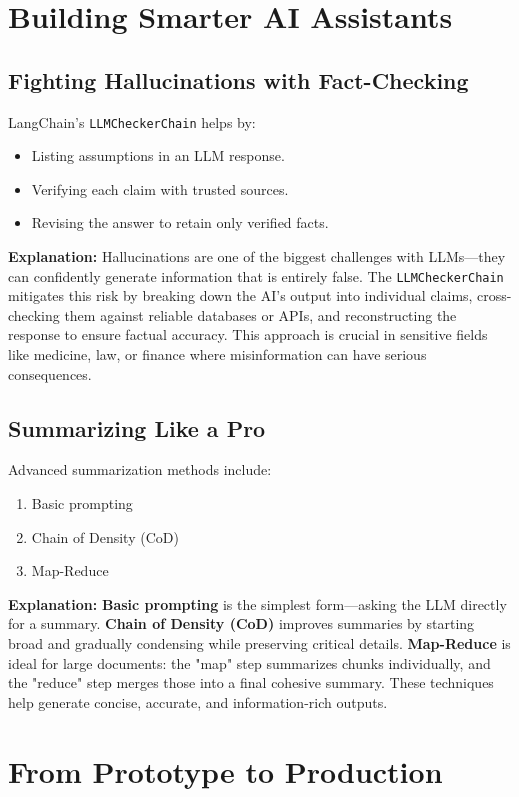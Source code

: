 \documentclass[12pt,a4paper]{article}
\begin{document}
\section{Building Smarter AI Assistants}
\subsection{Fighting Hallucinations with Fact-Checking}
LangChain's \texttt{LLMCheckerChain} helps by:
\begin{itemize}
    \item Listing assumptions in an LLM response.
    \item Verifying each claim with trusted sources.
    \item Revising the answer to retain only verified facts.
\end{itemize}

\noindent\textbf{Explanation:}
Hallucinations are one of the biggest challenges with LLMs—they can confidently generate information that is entirely false. The \texttt{LLMCheckerChain} mitigates this risk by breaking down the AI's output into individual claims, cross-checking them against reliable databases or APIs, and reconstructing the response to ensure factual accuracy. This approach is crucial in sensitive fields like medicine, law, or finance where misinformation can have serious consequences.

\subsection{Summarizing Like a Pro}
Advanced summarization methods include:
\begin{enumerate}
    \item Basic prompting
    \item Chain of Density (CoD)
    \item Map-Reduce
\end{enumerate}

\noindent\textbf{Explanation:}
\textbf{Basic prompting} is the simplest form---asking the LLM directly for a summary.
\textbf{Chain of Density (CoD)} improves summaries by starting broad and gradually condensing while preserving critical details.
\textbf{Map-Reduce} is ideal for large documents: the "map" step summarizes chunks individually, and the "reduce" step merges those into a final cohesive summary. These techniques help generate concise, accurate, and information-rich outputs.

\section{From Prototype to Production}
\end{document}
